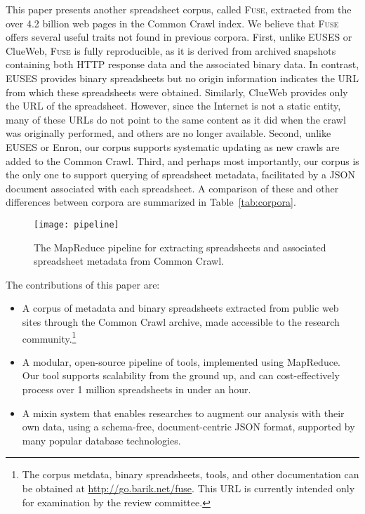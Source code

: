 \documentclass[conference]{IEEEtran}
\begin{document}
This paper presents another spreadsheet corpus, called \textsc{Fuse}, extracted from the over 4.2 billion web pages in the Common Crawl index. We believe that \textsc{Fuse} offers several useful traits not found in previous corpora. First, unlike EUSES or ClueWeb, \textsc{Fuse} is fully reproducible, as it is derived from archived snapshots containing both HTTP response data and the associated binary data. In contrast, EUSES provides binary spreadsheets but no origin information indicates the URL from which these spreadsheets were obtained. Similarly, ClueWeb provides only the URL of the spreadsheet. However, since the Internet is not a static entity, many of these URLs do not point to the same content as it did when the crawl was originally performed, and others are no longer available. Second, unlike EUSES or Enron, our corpus supports systematic updating as new crawls are added to the Common Crawl. Third, and perhaps most importantly, our corpus is the only one to support querying of spreadsheet metadata, facilitated by a JSON document associated with each spreadsheet. A comparison of these and other differences between corpora are summarized in Table~\ref{tab:corpora}.


\begin{figure*}[!t]
\centering
\texttt{[image: pipeline]}
\caption{The MapReduce pipeline for extracting spreadsheets and associated spreadsheet metadata from Common Crawl.\label{fig:mrpipeline}}
\end{figure*}


The contributions of this paper are:

 \begin{itemize}
 \item A corpus of metadata and binary spreadsheets extracted from public web sites through the Common Crawl archive, made accessible to the research community.\footnote{The corpus metdata, binary spreadsheets, tools, and other documentation can be obtained at \url{http://go.barik.net/fuse}. This URL is currently intended only for examination by the review committee.}
 \item A modular, open-source pipeline of tools, implemented using MapReduce. Our tool supports scalability from the ground up, and can cost-effectively process over 1 million spreadsheets in under an hour.
 \item A mixin system that enables researches to augment our analysis with their own data, using a schema-free, document-centric JSON format, supported by many popular database technologies.
 \end{itemize}
\end{document}
